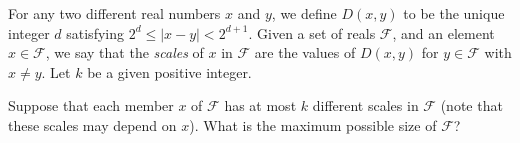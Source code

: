 For any two different real numbers $x$ and $y$, we define $D(x,y)$ to be the unique integer $d$ satisfying $2^d\le |x-y| < 2^{d+1}$. Given a set of reals $\mathcal F$, and an element $x\in \mathcal F$, we say that the \textit{scales} of $x$ in $\mathcal F$ are the values of $D(x,y)$ for $y\in\mathcal F$ with $x\neq y$. Let $k$ be a given positive integer.

Suppose that each member $x$ of $\mathcal F$ has at most $k$ different scales in $\mathcal F$ (note that these scales may depend on $x$). What is the maximum possible size of $\mathcal F$?